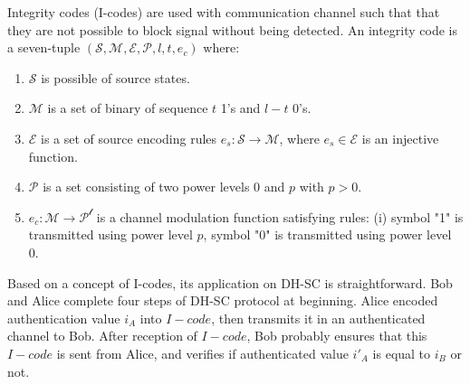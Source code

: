 Integrity codes (I-codes) are used with communication channel such that that they are not possible to block signal without being detected. An integrity code is a seven-tuple $(\mathcal{S},\mathcal{M},\mathcal{E},\mathcal{P},l,t,e_c)$ where:
\begin{enumerate}
\item $\mathcal{S}$ is possible of source states. 
\item $\mathcal{M}$ is a set of binary of sequence $t$ 1's and $l-t$ 0's. 
\item $\mathcal{E}$ is a set of source encoding rules $e_s: \mathcal{S} \rightarrow \mathcal{M}$, where $e_s \in \mathcal{E}$ is an injective function. 
\item $\mathcal{P}$ is a set consisting of two power levels 0 and $p$ with $p > 0$.
\item $e_c:\mathcal{M} \rightarrow \mathcal{P^l}$ is a channel modulation function satisfying rules: (i) symbol "1" is transmitted using power level $p$, symbol "0" is transmitted using power level 0. 
\end{enumerate} 

Based on a concept of I-codes, its application on DH-SC is straightforward. Bob and Alice complete four steps of DH-SC protocol at beginning. Alice encoded authentication value $i_A$ into $I-code$, then transmits it in an authenticated channel to Bob. After reception of $I-code$, Bob probably ensures that this $I-code$ is sent from Alice, and verifies if authenticated value $i'_A$ is equal to $i_B$ or not. 
 
